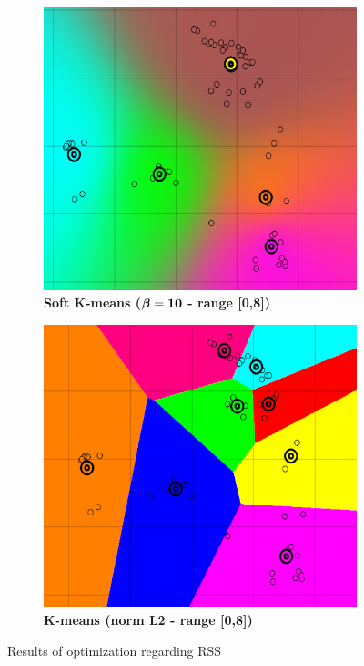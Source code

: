 \begin{figure} [ht]
\centering
	\begin{subfigure}[h]{0.45\textwidth}
    \centering
	\includegraphics[height=0.15\textheight]{./clustering/opt_RSS_k_soft_beta_10_range8.png}
	\caption{\bf Soft K-means ($\boldsymbol \beta \bf = 10$ - range [0,8])}
	\end{subfigure}
    \begin{subfigure}[h]{0.45\textwidth}
    \centering
    \includegraphics[height=0.15\textheight]{./clustering/opt_RSS_k_mean_L2_range8.png}
	\caption{\bf K-means (norm L2 - range [0,8])}
    \end{subfigure}
\caption{Results of optimization regarding RSS}
\label{fig:figure7}
\end{figure}

